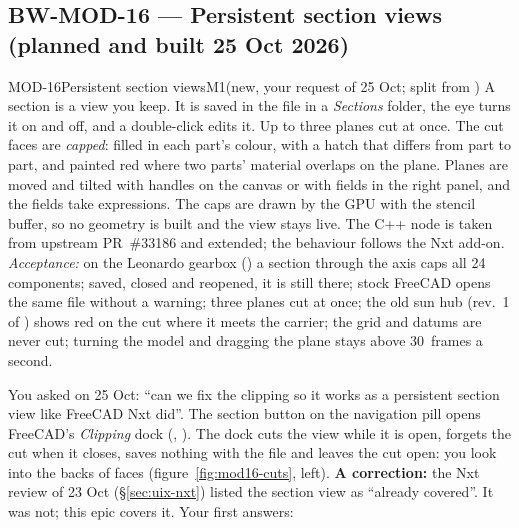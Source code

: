 \subsection{BW-MOD-16 --- Persistent section views (planned and built 25 Oct 2026)}\label{sec:mod16-plan}

\begin{epic}{MOD-16}{Persistent section views}{M1}{\stDone}{(new, your request of 25 Oct; split from )}
A section is a view you keep. It is saved in the file in a \emph{Sections} folder, the eye turns it on and off,
and a double-click edits it. Up to three planes cut at once. The cut faces are \emph{capped}: filled in each
part's colour, with a hatch that differs from part to part, and painted red where two parts' material overlaps on
the plane. Planes are moved and tilted with handles on the canvas or with fields in the right panel, and the fields
take expressions. The caps are drawn by the GPU with the stencil buffer, so no geometry is built and the view
stays live. The C++ node is taken from upstream PR~\#33186 and extended; the behaviour follows the Nxt add-on.
\emph{Acceptance:} on the Leonardo gearbox () a section through the axis caps all 24 components;
saved, closed and reopened, it is still there; stock FreeCAD opens the same file without a warning; three planes
cut at once; the old sun hub (rev.~1 of ) shows red on the cut where it meets the carrier; the
grid and datums are never cut; turning the model and dragging the plane stays above 30~frames a second.
\end{epic}

You asked on 25 Oct: ``can we fix the clipping so it works as a persistent section view like FreeCAD Nxt did''. The
section button on the navigation pill opens FreeCAD's \emph{Clipping} dock (,
). The dock cuts the view while it is open, forgets the cut when it closes, saves nothing
with the file and leaves the cut open: you look into the backs of faces (figure~\ref{fig:mod16-cuts}, left).
\textbf{A correction:} the Nxt review of 23 Oct (\S\ref{sec:uix-nxt}) listed the section view as ``already covered''.
It was not; this epic covers it. Your first answers:

